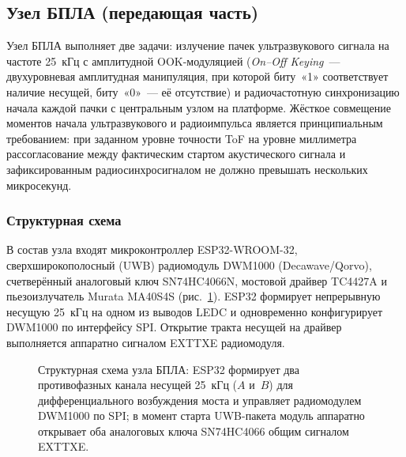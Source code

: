 \documentclass[a4paper,11pt]{article} %
\begin{document}
\subsection{Узел БПЛА (передающая часть)}
\label{sec:uav-node}

Узел БПЛА выполняет две задачи: излучение пачек ультразвукового сигнала на частоте 25~кГц
с амплитудной OOK-модуляцией (\textit{On--Off Keying}~--- двухуровневая амплитудная
манипуляция, при которой биту~«1» соответствует наличие несущей, биту~«0»~--- её
отсутствие) и радиочастотную синхронизацию начала каждой пачки с центральным
узлом на платформе. Жёсткое совмещение моментов начала ультразвукового и радиоимпульса
является принципиальным требованием: при заданном уровне точности ToF на уровне миллиметра
рассогласование между фактическим стартом акустического сигнала и зафиксированным
радиосинхросигналом не должно превышать нескольких микросекунд.

\subsubsection{Структурная схема}

В состав узла входят микроконтроллер ESP32-WROOM-32, сверхширокополосный (UWB) радиомодуль
DWM1000 (Decawave/Qorvo), счетверённый аналоговый ключ SN74HC4066N, мостовой драйвер
TC4427A и пьезоизлучатель Murata MA40S4S (рис.~\ref{fig:uav-block}).
ESP32 формирует непрерывную несущую 25~кГц на одном из выводов LEDC и одновременно
конфигурирует DWM1000 по интерфейсу SPI. Открытие тракта несущей на драйвер выполняется
аппаратно сигналом EXTTXE радиомодуля.

\begin{figure}[h!]
\centering
{}
\caption{Структурная схема узла БПЛА: ESP32 формирует два противофазных канала
несущей 25~кГц ($A$ и~$B$) для дифференциального возбуждения моста и управляет
радиомодулем DWM1000 по SPI; в момент старта UWB-пакета модуль аппаратно открывает
оба аналоговых ключа SN74HC4066 общим сигналом EXTTXE.}
\label{fig:uav-block}
\end{figure}
\end{document}
